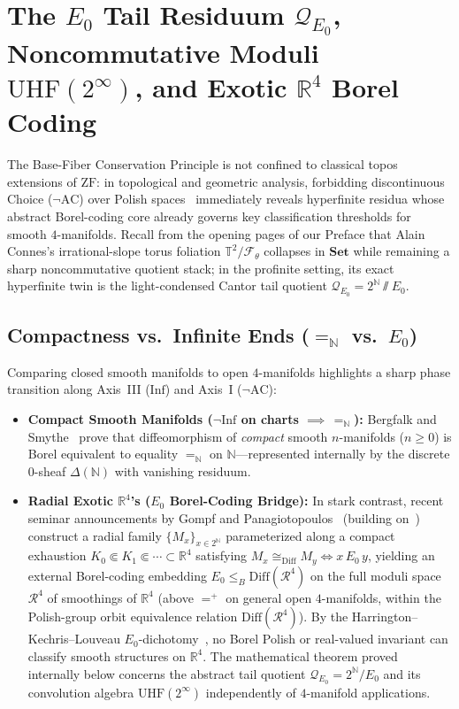 \section{The $E_0$ Tail Residuum $\mathcal{Q}_{E_0}$, Noncommutative Moduli $\mathrm{UHF}(2^\infty)$, and Exotic $\mathbb{R}^4$ Borel Coding}\label{sec:exotic-r4-e0}

The Base-Fiber Conservation Principle is not confined to classical topos extensions of $\mathrm{ZF}$: in topological and geometric analysis, forbidding discontinuous Choice ($\neg\mathrm{AC}$) over Polish spaces~\cite{Kechris95} immediately reveals hyperfinite residua whose abstract Borel-coding core already governs key classification thresholds for smooth $4$-manifolds. Recall from the opening pages of our Preface that Alain Connes's irrational-slope torus foliation $\mathbb{T}^2 / \mathcal{F}_\theta$ collapses in $\mathbf{Set}$ while remaining a sharp noncommutative quotient stack; in the profinite setting, its exact hyperfinite twin is the light-condensed Cantor tail quotient $\mathcal{Q}_{E_0} = 2^{\mathbb{N}} \sslash E_0$.

\subsection{Compactness vs.\ Infinite Ends ($=_{\mathbb{N}}$ vs.\ $E_0$)}

Comparing closed smooth manifolds to open $4$-manifolds highlights a sharp phase transition along Axis~III ($\mathrm{Inf}$) and Axis~I ($\neg\mathrm{AC}$):
\begin{itemize}
  \item \textbf{Compact Smooth Manifolds ($\neg\mathrm{Inf}$ on charts $\implies \, =_{\mathbb{N}}$):} Bergfalk and Smythe~\cite[Theorem~A]{BergfalkSmythe25} prove that diffeomorphism of \emph{compact} smooth $n$-manifolds ($n \ge 0$) is Borel equivalent to equality $=_{\mathbb{N}}$ on $\mathbb{N}$---represented internally by the discrete $0$-sheaf $\Delta(\mathbb{N})$ with vanishing residuum.
  \item \textbf{Radial Exotic $\mathbb{R}^4$'s ($E_0$ Borel-Coding Bridge):} In stark contrast, recent seminar announcements by Gompf and Panagiotopoulos~\cite{GompfPanagiotopoulos26} (building on~\cite{DeMichelisFreedman92}) construct a radial family $\{M_x\}_{x \in 2^{\mathbb{N}}}$ parameterized along a compact exhaustion $K_0 \Subset K_1 \Subset \cdots \subset \mathbb{R}^4$ satisfying $M_x \cong_{\mathrm{Diff}} M_y \iff x \,E_0\, y$, yielding an external Borel-coding embedding $E_0 \le_B \mathrm{Diff}(\mathcal{R}^4)$ on the full moduli space $\mathcal{R}^4$ of smoothings of $\mathbb{R}^4$ (above $=^+$ on general open $4$-manifolds, within the Polish-group orbit equivalence relation $\mathrm{Diff}(\mathcal{R}^4)$). By the Harrington--Kechris--Louveau $E_0$-dichotomy~\cite[Theorem~1.1]{HKL90}, no Borel Polish or real-valued invariant can classify smooth structures on $\mathbb{R}^4$. The mathematical theorem proved internally below concerns the abstract tail quotient $\mathcal{Q}_{E_0} = 2^{\mathbb{N}}/E_0$ and its convolution algebra $\mathrm{UHF}(2^\infty)$ independently of $4$-manifold applications.
\end{itemize}

